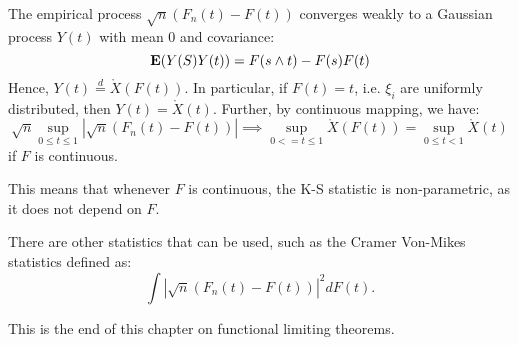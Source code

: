 \documentclass[../main/main.tex]{subfiles}
\begin{document}
\begin{theorem}
	The empirical process $\sqrt{n} (F_n(t) - F(t))$ converges weakly to a Gaussian process $Y(t)$ with mean 0 and covariance: \begin{equation*}
		\text{\textbf{E}}(Y(S) Y(t)) = F(s \wedge t) - F(s) F(t)
	\end{equation*}
	Hence, $Y(t) \overset{d}{=} \mathring{X} (F(t))$. In particular, if $F(t) = t$, i.e. $\xi_i$ are uniformly distributed, then $Y(t) = \mathring{X}(t)$. Further, by continuous mapping, we have: \[
		\sqrt{n}\sup_{0 \leq t \leq 1} | \sqrt{n} (F_n(t)- F(t))| \implies \sup_{0<= t \leq 1}\mathring{X}(F(t)) = \sup_{0 \leq t < 1} \mathring{X}(t)
	\] if $F$ is continuous.
\end{theorem}
This means that whenever $F$ is continuous, the K-S statistic is non-parametric, as it does not depend on $F$.
\begin{remark}
	There are other statistics that can be used, such as the Cramer Von-Mikes statistics defined as: \[
		\int |\sqrt{n} (F_n(t) - F(t))|^2 d F(t).
	\]
\end{remark}
This is the end of this chapter on functional limiting theorems.
\end{document}
